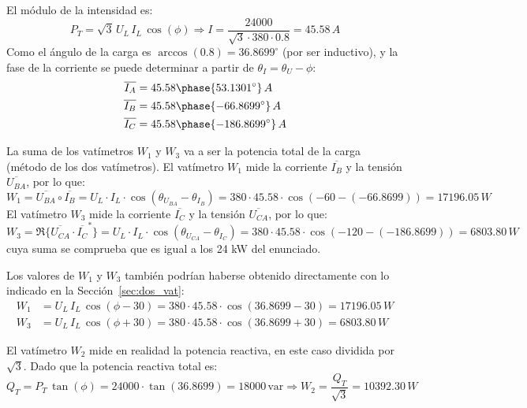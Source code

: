 \begin{example}
El módulo de la intensidad es:
\begin{equation*}
    P_T=\sqrt{3}\,U_L\,I_L\,\cos(\phi)\Rightarrow I=\dfrac{24000}{\sqrt{3}\cdot 380\cdot 0.8}=45.58\,A
\end{equation*}
Como el ángulo de la carga es $\arccos{(0.8)}=36.8699^\circ$ (por ser inductivo), y la fase de la corriente se puede determinar a partir de $\theta_I=\theta_U-\phi$:
\begin{align*}
    \overline{I_A}&=45.58\phase{53.1301^\circ}\,A\\
    \overline{I_B}&=45.58\phase{-66.8699^\circ}\,A\\
    \overline{I_C}&=45.58\phase{-186.8699^\circ}\,A
\end{align*}

La suma de los vatímetros $W_1$ y $W_3$ va a ser la potencia total de la carga (método de los dos vatímetros). El vatímetro $W_1$ mide la corriente $\overline{I_B}$ y la tensión $\overline{U_{BA}}$, por lo que: \begin{equation*}
    W_1=\overline{U_{BA}}\circ \overline{I_B}=U_{L}\cdot I_L\cdot \cos{(\theta_{U_{BA}}-\theta_{I_B})}= 380\cdot 45.58\cdot \cos(-60-(-66.8699))=17196.05\,W
\end{equation*}
El vatímetro $W_3$ mide la corriente $\overline{I_C}$ y la tensión $\overline{U_{CA}}$, por lo que: \begin{equation*}
    W_3=\Re\{\overline{U_{CA}}\cdot \overline{I_C}^*\}=U_{L}\cdot I_L\cdot \cos{(\theta_{U_{CA}}-\theta_{I_C})}= 380\cdot 45.58\cdot \cos(-120-(-186.8699))=6803.80\,W
\end{equation*}
cuya suma se comprueba que es igual a los 24 kW del enunciado.
\begin{remark}
    Los valores de $W_1$ y $W_3$ también podrían haberse obtenido directamente con lo indicado en la Sección~\ref{sec:dos_vat}:
    \begin{align*}
        W_1&=U_L\,I_L\,\cos(\phi-30)=380\cdot 45.58\cdot \cos(36.8699-30)=17196.05\,W\\
        W_3&=U_L\,I_L\,\cos(\phi+30)=380\cdot 45.58\cdot \cos(36.8699+30)=6803.80\,W
    \end{align*}
\end{remark}

El vatímetro $W_2$ mide en realidad la potencia reactiva, en este caso dividida por $\sqrt{3}$. Dado que la potencia reactiva total es:
\begin{equation*}
    Q_T=P_T\,\tan(\phi)=24000\cdot\tan(36.8699)=18000 \,\text{var}\Rightarrow W_2=\dfrac{Q_T}{\sqrt{3}}=10392.30\,W
\end{equation*}


\end{example}
